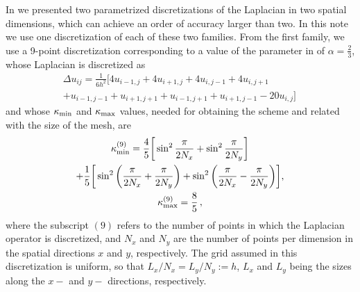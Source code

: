 \documentclass[preprint,12pt]{elsarticle}
\newcommand{\kmin}{\kappa_{\rm min}}
\newcommand{\kmax}{\kappa_{\rm max}}
\begin{document}
In \cite{Adsuara2017446} we presented two
parametrized discretizations of the
  Laplacian in two spatial dimensions, which can achieve an order of accuracy larger than two. In this note
we use one discretization of each of these two families. From the
first family, we use  a 9-point discretization corresponding to
a value of the parameter in \cite{Adsuara2017446} of $ \alpha=\frac{2}{3}$, whose
Laplacian is discretized as
%
\begin{gather}
\Delta u_{ij}=\frac{1}{6 h^2} \bigg [ 4 u_{i-1,j} + 4 u_{i+1,j} + 4u_{i,j-1} + 4 u_{i,j+1} \nonumber \\
+ u_{i-1,j-1} + u_{i+1,j+1} + u_{i-1,j+1} + u_{i+1,j-1} - 20 u_{i,j} \bigg ]\, 
\label{eq:9-points}
\end{gather}  
%
and whose $\kmin$ and $\kmax$ values, needed for obtaining the scheme and related with the size of the mesh, are
%
\begin{gather}
\kmin^{(9)} = \frac{4}{5} \bigg [ \sin^2{\frac{\pi}{2 N_x}} + \sin^2{\frac{\pi}{2 N_y}} \bigg ] \\
+ \frac{1}{5} \bigg [ \sin^2{ \bigg ( \frac{\pi}{2 N_x} +\frac{\pi}{2 N_y} \bigg )} + \sin^2{ \bigg ( \frac{\pi}{2 N_x} - \frac{\pi}{2 N_y} \bigg )} \bigg ] ,\\
\kmax^{(9)} = \frac{8}{5} \,,
\label{Eq:kmkM9p}
\end{gather}  
%
where the subscript $(9)$ refers to the number of points
  in which the Laplacian operator is discretized, and $N_x$ and $N_y$
  are the number of points per dimension in the spatial directions $x$
  and $y$, respectively. The grid assumed in this discretization is
  uniform, so that $L_x/N_x=L_y/N_y:=h$, $L_x$ and $L_y$ being the
  sizes along the $x-$ and $y-$ directions, respectively.
\end{document}
